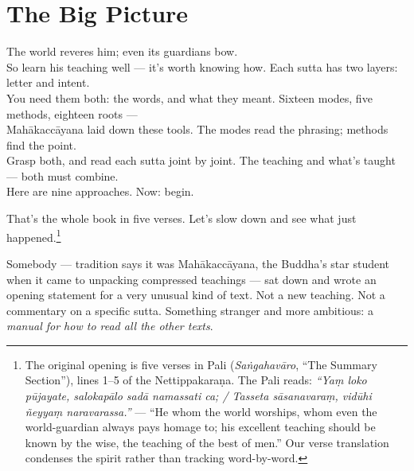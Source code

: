\chapter{The Big Picture}
\label{ch:big-picture}

\begin{versebox}
The world reveres him; even its guardians bow.\\
So learn his teaching well --- it's worth knowing how.
\stanza
Each sutta has two layers: letter and intent.\\
You need them both: the words, and what they meant.
\stanza
Sixteen modes, five methods, eighteen roots ---\\
Mahākaccāyana laid down these tools.
\stanza
The modes read the phrasing; methods find the point.\\
Grasp both, and read each sutta joint by joint.
\stanza
The teaching and what's taught --- both must combine.\\
Here are nine approaches. Now: begin.
\end{versebox}

\noindent That's the whole book in five verses. Let's slow down and see what just happened.\footnote{The original opening is five verses in Pali (\textit{Saṅgahavāro}, ``The Summary Section''), lines 1--5 of the Nettippakaraṇa. The Pali reads: \textit{``Yaṃ loko pūjayate, salokapālo sadā namassati ca; / Tasseta sāsanavaraṃ, vidūhi ñeyyaṃ naravarassa.''} --- ``He whom the world worships, whom even the world-guardian always pays homage to; his excellent teaching should be known by the wise, the teaching of the best of men.'' Our verse translation condenses the spirit rather than tracking word-by-word.}

Somebody --- tradition says it was Mahākaccāyana, the Buddha's star student when it came to unpacking compressed teachings --- sat down and wrote an opening statement for a very unusual kind of text. Not a new teaching. Not a commentary on a specific sutta. Something stranger and more ambitious: a \textit{manual for how to read all the other texts}.

